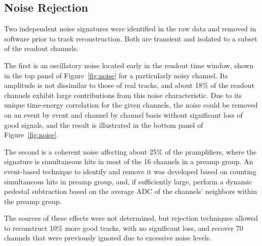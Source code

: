\documentclass[twocolumn,showpacs,superscriptaddress,groupedaddress]{revtex4}
\begin{document}
\subsection{Noise Rejection}
Two independent noise signatures were identified in the raw data and removed in software prior to track reconstruction.  Both are transient and isolated to a subset of the readout channels. 

The first is an oscillatory noise located early in the readout time window, shown in the top panel of Figure~\ref{fig:noise} for a particularly noisy channel.  Its amplitude is not dissimilar to those of real tracks, and about 18\% of the readout channels exhibit large contributions from this noise characteristic.  Due to its unique time-energy correlation for the given channels, the noise could be removed on an event by event and channel by channel basis without significant loss of good signals, and the result is illustrated in the bottom panel of Figure~\ref{fig:noise}.

The second is a coherent noise affecting about 25\% of the pramplifiers, where the signature is simultaneous hits in most of the 16 channels in a preamp group.   An event-based technique to identify and remove it was developed based on counting simultaneous hits in preamp group, and, if sufficiently large, perform a dynamic pedestal subtraction based on the average ADC of the channels' neighbors within the preamp group.

The sources of these effects were not determined, but rejection techniques allowed to reconstruct 10\% more good tracks, with no significant loss, and recover 70 channels that were previously ignored due to excessive noise levels.
\end{document}
